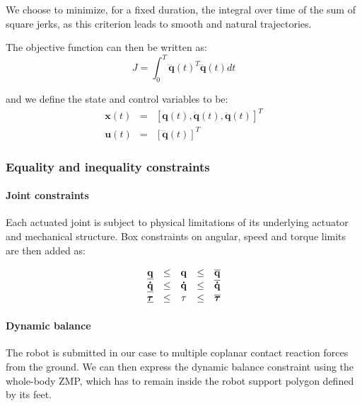 We choose to minimize, for a fixed duration, the integral over time of
the sum of square jerks, as this criterion leads to smooth and natural
trajectories.

The objective function can then be written as:
\begin{equation}
  J = \int_{0}^{T}\mathbf{\dddot{q}}(t)^T\mathbf{\dddot{q}}(t) dt
  \label{objective-function}
\end{equation}

and we define the state and control variables to be:
\begin{equation}
  \begin{array}{rcl}
  \mathbf{x}(t) & = & [\mathbf{q}(t), \mathbf{\dot{q}}(t), \mathbf{\ddot{q}}(t)]^T \\
  \mathbf{u}(t) & = & [\mathbf{\dddot{q}}(t)]^T
  \end{array}
  \label{variables}
\end{equation}

\subsubsection{Equality and inequality constraints}

\paragraph{Joint constraints}
Each actuated joint is subject to physical limitations of its
underlying actuator and mechanical structure. Box constraints on
angular, speed and torque limits are then added as:

\begin{equation}
  \begin{array}{rcccl}
    \underline{\mathbf{q}} & \le & \mathbf{q} & \le & \overline{\mathbf{q}} \\
    \underline{\mathbf{\dot{q}}} & \le & \mathbf{\dot{q}} & \le & \overline{\mathbf{\dot{q}}} \\
    \underline{\boldsymbol{\tau}} & \le & \mathbf{\tau} & \le & \overline{\boldsymbol{\tau}}
  \end{array}
  \label{joint-constraints}
\end{equation}

\paragraph{Dynamic balance}
The robot is submitted in our case to multiple coplanar contact
reaction forces from the ground. We can then express the dynamic
balance constraint using the whole-body ZMP, which has to remain
inside the robot support polygon defined by its feet.

